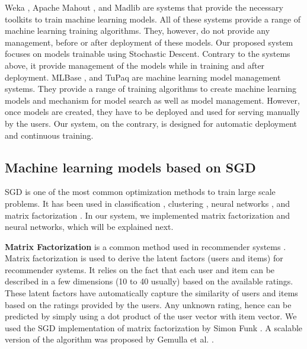 \documentclass{sig-alternate-05-2015}
\begin{document}
Weka \cite{hall2009weka}, Apache Mahout \cite{Owen:2011:MA:2132656}, and Madlib \cite{hellerstein2012madlib} are systems that provide the necessary toolkits to train machine learning models. All of these systems provide a range of machine learning training algorithms. 
They, however, do not provide any management, before or after deployment of these models. 
Our proposed system focuses on models trainable using Stochastic 
 Descent. 
Contrary to the systems above, it provide management of the models while in training and after deployment.
MLBase \cite{kraska2013mlbase}, and TuPaq \cite{sparks2015tupaq} are machine learning model management systems.
They provide a range of training algorithms to create machine learning models and mechanism for model search as well as model management.
However, once models are created, they have to be deployed and used for serving manually by the users.
Our system, on the contrary, is designed for automatic deployment and continuous training.

\subsection{Machine learning models based on SGD}
SGD is one of the most common optimization methods to train large scale problems. 
It has been used in classification \cite{zhang2004solving}, clustering \cite{bottou1995convergence}, neural networks \cite{dean2012large}, and matrix factorization \cite{funk2006netflix}.
In our system, we implemented matrix factorization and neural networks, which will be explained next. 

\textbf{Matrix Factorization} is a common method used in recommender systems \cite{koren2009matrix}. 
Matrix factorization is used to derive the latent factors (users and items) for recommender systems.
It relies on the fact that each user and item can be described in a few dimensions (10 to 40 usually) based on the available ratings.
These latent factors have automatically capture the similarity of users and items based on the ratings provided by the users.
Any unknown rating, hence can be predicted by simply using a dot product of the user vector with item vector.
We used the SGD implementation of matrix factorization by Simon Funk \cite{funk2006netflix}. 
A scalable version of the algorithm was proposed by Gemulla et al. \cite{gemulla2011large}.
\end{document}
